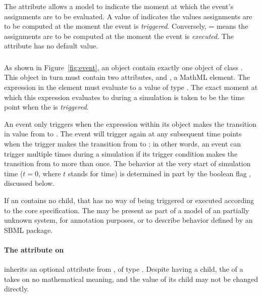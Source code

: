 The attribute  allows a model to
indicate the moment at which the event's assignments are to be
evaluated.  A value of  indicates the values assignments
are to be computed at the moment the event is \emph{triggered}.
Conversely, = means the
assignments are to be computed at the moment the event is
\emph{executed}.  The attribute has no default value.


\subsubsection{}
\label{sec:trigger}
\label{sec:event-trigger}

As shown in Figure~\ref{fig:event}, an \Event object  contain
exactly one object of class \Trigger.  This object in turn must
contain two attributes,  and
,  a MathML  element.
The expression in the  element must evaluate to a
value of type .  The exact moment at which this
expression evaluates to  during a simulation is taken to
be the time point when the \Event is \emph{triggered}.

An event only triggers when the expression within its \Trigger object
makes the transition in value from  to .  The
event will trigger again at any subsequent time points when the
trigger makes the transition from  to ; in
other words, an event can trigger multiple times during a simulation
if its trigger condition makes the transition from  to
 more than once.  The behavior at the very start of
simulation time (\ie $t = 0$, where $t$ stands for time) is
determined in part by the boolean flag
, discussed below.

\begin{blockChanged}
If an \Event contains no \Trigger child, that \Event has no way of being triggered or executed according to the core specification.  The \Event may be present as part of a model of an partially unknown system, for annotation purposes, or to describe behavior defined by an SBML package.
\end{blockChanged}

\begin{blockChanged}
\paragraph{The  attribute on }
\label{sec:trigger-id}

\Trigger inherits an optional  attribute from \SBase, of type .  Despite having a  child, the  of a \Trigger takes on no mathematical meaning, and the value of its  child may not be changed directly.
\end{blockChanged}


